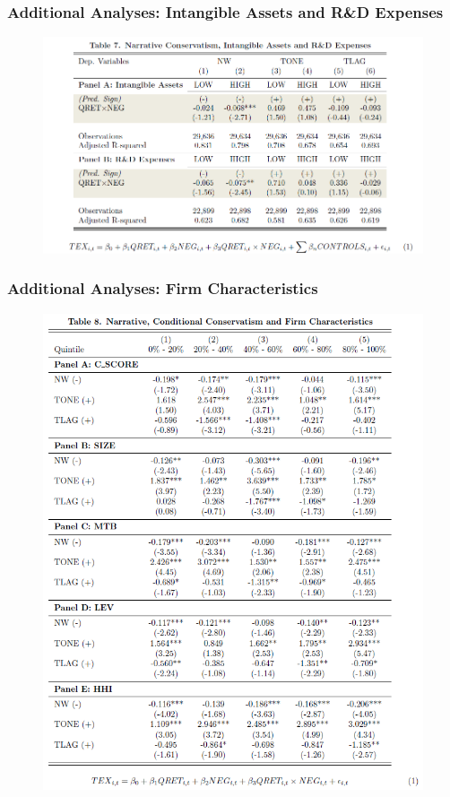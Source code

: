 \documentclass{beamer}
\begin{document}
\begin{frame}[noframenumbering]
\frametitle{Additional Analyses: Intangible Assets and R\&D Expenses}
\begin{figure}[h]
	\centering
	\includegraphics[width=0.9\linewidth]{tab7}
	\label{tab7}
\end{figure}

\end{frame}
\begin{frame}[noframenumbering]
\frametitle{Additional Analyses: Firm Characteristics}
\begin{figure}[h]
\centering
\includegraphics[width=0.65\linewidth]{tab8}
\label{tab8}
\end{figure}

\end{frame}
\end{document}
